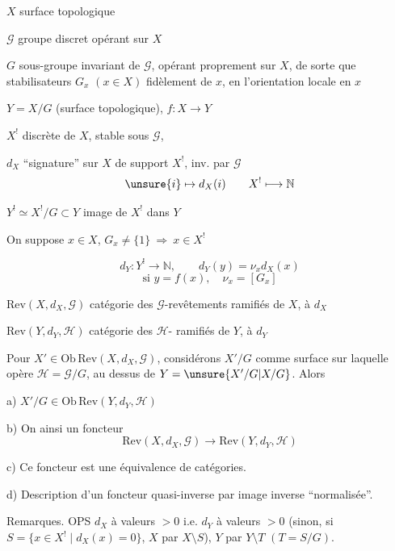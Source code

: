 
$X$ surface topologique

$\mathcal G$ groupe discret opérant sur $X$

$G$ sous-groupe invariant de $\mathcal G$, opérant
proprement sur $X$, de sorte que 
 stabilisateurs $G_x$ $(x\in X)$
 fidèlement  de $x$, en
 l'orientation locale en $x$

$Y=X/G$ (surface topologique), $f\colon X\to Y$

$X^{!}$  discrète de $X$, stable sous $\mathcal G$,

$d_X$ ``signature'' sur $X$ de support $X^{!}$, inv. par $\mathcal G$
\[
\unsure{i}\mapsto d_X(i)
\qquad X^{!}\longmapsto\mathbb N
\]

$Y^{!}\simeq X^{!}/G\subset Y$ \quad image de $X^{!}$ dans $Y$

On suppose $x\in X$, $G_x\ne\{1\}\ \Rightarrow\ x\in X^{!}$

\[
d_Y\colon Y^{!}\to\mathbb N,\qquad d_Y(y)=\nu_x d_X(x)
\]
\[
\text{si } y=f(x),\quad \nu_x=[G_x]
\]

$\mathrm{Rev}(X,d_X,\mathcal G)$ catégorie des $\mathcal G$-revêtements
ramifiés de $X$,  à $d_X$

$\mathrm{Rev}(Y,d_Y,\mathcal H)$ catégorie des $\mathcal H$-
ramifiés de $Y$,  à $d_Y$

Pour $X'\in\mathrm{Ob}\,\mathrm{Rev}(X,d_X,\mathcal G)$, considérons
$X'/G$ comme surface sur laquelle opère
$\mathcal H=\mathcal G/G$, au dessus de $Y=\unsure{X'/G|X/G}$. Alors



 a) $X'/G\in\mathrm{Ob}\,\mathrm{Rev}(Y,d_Y,\mathcal H)$

 b) On  ainsi un foncteur
\[
\mathrm{Rev}(X,d_X,\mathcal G)\longrightarrow
\mathrm{Rev}(Y,d_Y,\mathcal H) \tag{19}
\]

 c) Ce foncteur est une équivalence de catégories.

 d) Description d'un foncteur quasi-inverse par image inverse ``normalisée''.

Remarques. OPS $d_X$ à valeurs $>0$ i.e. $d_Y$ à valeurs
$>0$ (sinon, si $S=\{x\in X^{!}\mid d_X(x)=0\}$, 
$X$ par $X\setminus S$), $Y$ par $Y\setminus T$ $(T=S/G)$.

